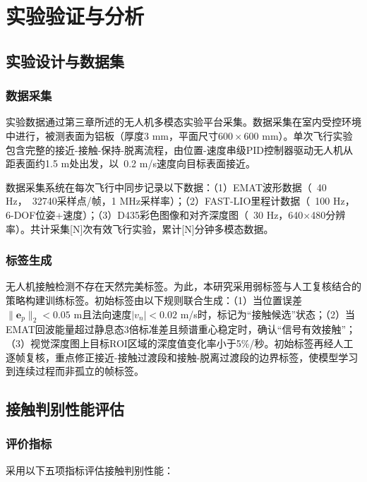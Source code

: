 \chapter{实验验证与分析}

\section{实验设计与数据集}

\subsection{数据采集}\label{sec:data_collection}

实验数据通过第三章所述的无人机多模态实验平台采集。数据采集在室内受控环境中进行，被测表面为铝板（厚度3 mm，平面尺寸$600 \times 600$ mm）。单次飞行实验包含完整的接近-接触-保持-脱离流程，由位置-速度串级PID控制器驱动无人机从距表面约1.5 m处出发，以~0.2 m/s速度向目标表面接近。

数据采集系统在每次飞行中同步记录以下数据：（1）EMAT波形数据（~40 Hz，~32740采样点/帧，1 MHz采样率）；（2）FAST-LIO里程计数据（~100 Hz，6-DOF位姿+速度）；（3）D435彩色图像和对齐深度图（~30 Hz，640$\times$480分辨率）。共计采集[N]次有效飞行实验，累计[N]分钟多模态数据。%

\subsection{标签生成}

无人机接触检测不存在天然完美标签。为此，本研究采用弱标签与人工复核结合的策略构建训练标签。初始标签由以下规则联合生成：（1）当位置误差$\|\mathbf{e}_p\|_2 < 0.05$ m且法向速度$|v_n| < 0.02$ m/s时，标记为“接触候选”状态；（2）当EMAT回波能量超过静息态3倍标准差且频谱重心稳定时，确认“信号有效接触”；（3）视觉深度图上目标ROI区域的深度值变化率小于5\%/秒。初始标签再经人工逐帧复核，重点修正接近-接触过渡段和接触-脱离过渡段的边界标签，使模型学习到连续过程而非孤立的帧标签。

\section{接触判别性能评估}

\subsection{评价指标}

采用以下五项指标评估接触判别性能：

